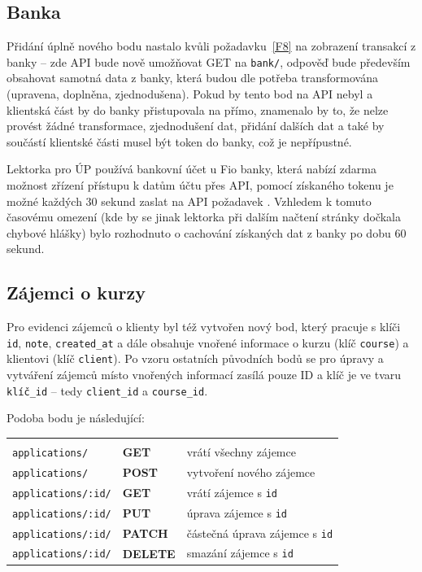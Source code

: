 \subsection{Banka}

Přidání úplně nového bodu nastalo kvůli požadavku~\ref{F8} na zobrazení transakcí z banky -- zde API bude nově umožňovat GET na \verb|bank/|, odpověď bude především obsahovat samotná data z banky, která budou dle potřeba transformována (upravena, doplněna, zjednodušena). Pokud by tento bod na API nebyl a klientská část by do banky přistupovala na přímo, znamenalo by to, že nelze provést žádné transformace, zjednodušení dat, přidání dalších dat a také by součástí klientské části musel být token do banky, což je nepřípustné.

Lektorka pro ÚP používá bankovní účet u Fio banky, která nabízí zdarma možnost zřízení přístupu k datům účtu přes API, pomocí získaného tokenu je možné každých 30 sekund zaslat na API požadavek \cite{fioapi}. Vzhledem k tomuto časovému omezení (kde by se jinak lektorka při dalším načtení stránky dočkala chybové hlášky) bylo rozhodnuto o cachování získaných dat z banky po dobu 60 sekund.

\subsection{Zájemci o kurzy}

Pro evidenci zájemců o klienty byl též vytvořen nový bod, který pracuje s klíči \verb|id|, \verb|note|, \verb|created_at| a dále obsahuje vnořené informace o kurzu (klíč \verb|course|) a klientovi (klíč \verb|client|). Po vzoru ostatních původních bodů se pro úpravy a vytváření zájemců místo vnořených informací zasílá pouze ID a klíč je ve tvaru \verb|klíč_id| -- tedy \verb|client_id| a \verb|course_id|.

Podoba bodu je následující:

{\centering
\begin{tabular}{p{\apiA\textwidth}p{\apiB\textwidth}p{\apiC\textwidth}}&&\\
    \verb|applications/|             & \textbf{GET}      & vrátí všechny zájemce\\
    \verb|applications/|             & \textbf{POST}     & vytvoření nového zájemce\\
    \verb|applications/:id/|         & \textbf{GET}      & vrátí zájemce s \verb|id|\\
    \verb|applications/:id/|         & \textbf{PUT}      & úprava zájemce s \verb|id|\\
    \verb|applications/:id/|         & \textbf{PATCH}    & částečná úprava zájemce s \verb|id|\\
    \verb|applications/:id/|         & \textbf{DELETE}   & smazání zájemce s \verb|id|\\
\end{tabular}}


